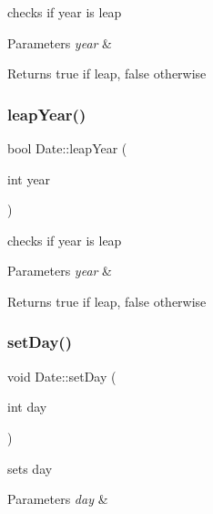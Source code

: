 checks if year is leap 


\begin{DoxyParams}{Parameters}
{\em year} & \\
\hline
\end{DoxyParams}
\begin{DoxyReturn}{Returns}
true if leap, false otherwise 
\end{DoxyReturn}
\hypertarget{class_date_ac44b1159cfc6b4936fddd909b0c2a8f1}{}\label{class_date_ac44b1159cfc6b4936fddd909b0c2a8f1} 
\subsubsection{\texorpdfstring{leap\+Year()}{leapYear()}}
{\footnotesize\ttfamily bool Date\+::leap\+Year (\begin{DoxyParamCaption}\item[{int}]{year }\end{DoxyParamCaption})}



checks if year is leap 


\begin{DoxyParams}{Parameters}
{\em year} & \\
\hline
\end{DoxyParams}
\begin{DoxyReturn}{Returns}
true if leap, false otherwise 
\end{DoxyReturn}
\hypertarget{class_date_a2f97b9d1ac5ef0ef6b6cab3335c5303d}{}\label{class_date_a2f97b9d1ac5ef0ef6b6cab3335c5303d} 
\subsubsection{\texorpdfstring{set\+Day()}{setDay()}}
{\footnotesize\ttfamily void Date\+::set\+Day (\begin{DoxyParamCaption}\item[{int}]{day }\end{DoxyParamCaption})}



sets day 


\begin{DoxyParams}{Parameters}
{\em day} & \\
\hline
\end{DoxyParams}
\hypertarget{class_date_a23aa56014dd581d691607df5d4474f64}{}\label{class_date_a23aa56014dd581d691607df5d4474f64} 
